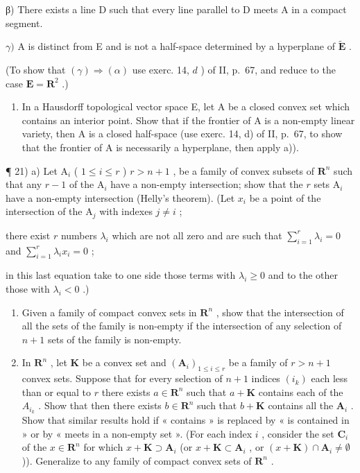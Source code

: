 β) There exists a line D such that every line parallel to D meets A in a compact segment.

\(\gamma)\) A is distinct from E and is not a half-space determined by a hyperplane of \(\tilde{\mathbf{E}}\) .

(To show that \((\gamma) \Rightarrow (\alpha)\) use exerc. 14, \(d\) ) of II, p.~67, and reduce to the case \(\mathbf{E} = \mathbf{R}^2\) .)

\begin{enumerate}
\def\labelenumi{\alph{enumi})}
\setcounter{enumi}{1}
\tightlist
\item
  In a Hausdorff topological vector space E, let A be a closed convex set which contains an interior point. Show that if the frontier of A is a non-empty linear variety, then A is a closed half-space (use exerc. 14, d) of II, p.~67, to show that the frontier of A is necessarily a hyperplane, then apply a)).
\end{enumerate}

¶ 21) a) Let \(\mathrm{A}_i\) ( \(1 \leqslant i \leqslant r\) ) \(r > n + 1\) , be a family of convex subsets of \(\mathbf{R}^n\) such that any \(r - 1\) of the \(\mathrm{A}_i\) have a non-empty intersection; show that the \(r\) sets \(\mathrm{A}_i\) have a non-empty intersection (Helly's theorem). (Let \(x_i\) be a point of the intersection of the \(\mathrm{A}_j\) with indexes \(j \neq i\) ;

there exist \(r\) numbers \(\lambda_{i}\) which are not all zero and are such that \(\sum_{i=1}^{r} \lambda_{i} = 0\) and \(\sum_{i=1}^{r} \lambda_{i} x_{i} = 0\) ;

in this last equation take to one side those terms with \(\lambda_{i} \geqslant 0\) and to the other those with \(\lambda_{i} < 0\) .)

\begin{enumerate}
\def\labelenumi{\alph{enumi})}
\setcounter{enumi}{1}
\item
  Given a family of compact convex sets in \(\mathbf{R}^n\) , show that the intersection of all the sets of the family is non-empty if the intersection of any selection of \(n + 1\) sets of the family is non-empty.
\item
  In \(\mathbf{R}^n\) , let \(\mathbf{K}\) be a convex set and \((\mathbf{A}_i)_{1 \leqslant i \leqslant r}\) be a family of \(r > n + 1\) convex sets. Suppose that for every selection of \(n + 1\) indices \((i_k)\) each less than or equal to \(r\) there exists \(a \in \mathbf{R}^n\) such that \(a + \mathbf{K}\) contains each of the \(A_{i_k}\) . Show that then there exists \(b \in \mathbf{R}^n\) such that \(b + \mathbf{K}\) contains all the \(\mathbf{A}_i\) . Show that similar results hold if « contains » is replaced by « is contained in » or by « meets in a non-empty set ». (For each index \(i\) , consider the set \(\mathbf{C}_i\) of the \(x \in \mathbf{R}^n\) for which \(x + \mathbf{K} \supset \mathbf{A}_i\) (or \(x + \mathbf{K} \subset \mathbf{A}_i\) , or \((x + \mathbf{K}) \cap \mathbf{A}_i \neq \emptyset\) )). Generalize to any family of compact convex sets of \(\mathbf{R}^n\) .
\end{enumerate}

